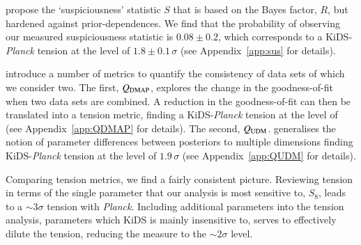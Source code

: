 \citet{handley/lemos:2019} propose the `suspiciousness' statistic $S$ that is based on the Bayes factor, $R$, but hardened against prior-dependences.   We find that the probability of observing our measured suspiciousness statistic is $0.08\pm0.2$, which corresponds to a KiDS-{\it Planck} tension at the level of $1.8\pm0.1\,\sigma$ (see Appendix~\ref{app:sus} for details).

\citet{Raveri2019} introduce a number of metrics to quantify the consistency of data sets of which we consider two.   The first, $Q_{\rm DMAP}$, explores the change in the goodness-of-fit when two data sets are combined.   A reduction in the goodness-of-fit can then be translated into a tension metric, finding a KiDS-{\it Planck} tension at the level of \preliminary{$2.4\sigma$} (see Appendix~\ref{app:QDMAP} for details).    The second, $Q_{\rm UDM}$. generalises the notion of parameter differences between posteriors to multiple dimensions finding KiDS-{\it Planck} tension at the level of $1.9\,\sigma$ (see Appendix~\ref{app:QUDM} for details).   

Comparing tension metrics, we find a fairly consistent picture.  Reviewing tension in terms of the single parameter that our \tttp analysis is most sensitive to, $S_8$, leads to a $\sim 3\sigma$ tension with {\it Planck}.   Including additional parameters into the tension analysis, parameters which KiDS is mainly insensitive to, serves to effectively dilute the tension, reducing the measure to the $\sim 2\sigma$ level.    













